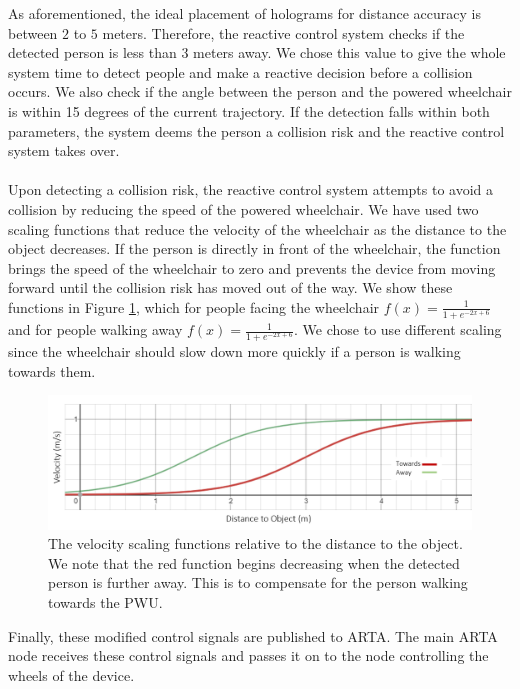 As aforementioned, the ideal placement of holograms for distance accuracy is between $2$ to $5$ meters. Therefore, the reactive control system checks if the detected person is less than $3$ meters away. We chose this value to give the whole system time to detect people and make a reactive decision before a collision occurs. We also check if the angle between the person and the powered wheelchair is within 15 degrees of the current trajectory. If the detection falls within both parameters, the system deems the person a collision risk and the reactive control system takes over.

\paragraph{} Upon detecting a collision risk, the reactive control system attempts to avoid a collision by reducing the speed of the powered wheelchair. We have used two scaling functions that reduce the velocity of the wheelchair as the distance to the object decreases. If the person is directly in front of the wheelchair, the function brings the speed of the wheelchair to zero and prevents the device from moving forward until the collision risk has moved out of the way. We show these functions in Figure \ref{fig:distanceScalingFunctions}, which for people facing the wheelchair $f(x)=\frac{1}{1 + e^{-2x+6}}$ and for people walking away $f(x)=\frac{1}{1 + e^{-2x+6}}$. We chose to use different scaling since the wheelchair should slow down more quickly if a person is walking towards them.

\begin{figure}[ht]
	\centering
	\includegraphics[width=0.8\linewidth]{img/chapter5_implementation/distanceScaling.PNG}
	\caption{The velocity scaling functions relative to the distance to the object. We note that the red function begins decreasing when the detected person is further away. This is to compensate for the person walking towards the PWU.}
	\label{fig:distanceScalingFunctions}
\end{figure} 

Finally, these modified control signals are published to ARTA. The main ARTA node receives these control signals and passes it on to the node controlling the wheels of the device.

